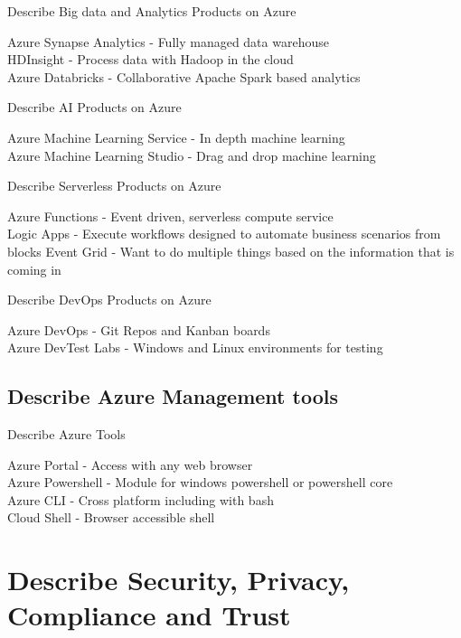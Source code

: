 \documentclass[addpoints]{exam}
\begin{document}
\begin{questions}
\question Describe Big data and Analytics Products on Azure
\begin{solution}[2in]
	Azure Synapse Analytics - Fully managed data warehouse\\
	HDInsight - Process data with Hadoop in the cloud\\
	Azure Databricks - Collaborative Apache Spark based analytics
\end{solution}

\question Describe AI Products on Azure
\begin{solution}[2in]
	Azure Machine Learning Service - In depth machine learning\\
	Azure Machine Learning Studio - Drag and drop machine learning
\end{solution}

\question Describe Serverless Products on Azure
\begin{solution}[2in]
	Azure Functions - Event driven, serverless compute service\\
	Logic Apps - Execute workflows designed to automate business scenarios from blocks
	Event Grid - Want to do multiple things based on the information that is coming in
\end{solution}

\question Describe DevOps Products on Azure
\begin{solution}[2in]
	Azure DevOps - Git Repos and Kanban boards\\
	Azure DevTest Labs - Windows and Linux environments for testing
\end{solution}
\subsection{Describe Azure Management tools}
\question Describe Azure Tools
\begin{solution}[2in]
	Azure Portal - Access with any web browser\\
	Azure Powershell - Module for windows powershell or powershell core\\
	Azure CLI - Cross platform including with bash\\
	Cloud Shell - Browser accessible shell
\end{solution}
\section{Describe Security, Privacy, Compliance and Trust}

\end{questions}
\end{document}
